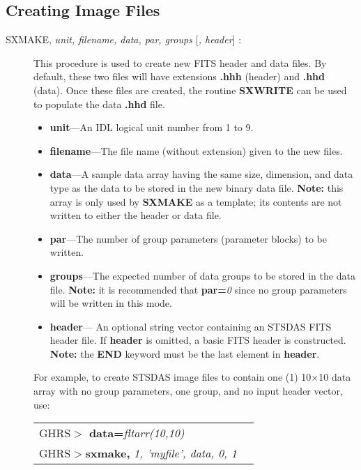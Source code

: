 \subsection{\bf Creating Image Files}
\begin{description}
\item [SXMAKE, {\it unit, filename, data, par, groups $[$, header$]$} :] 

This
procedure is used to create new FITS header and data files. By
default, these two files will have extensions {\bf .hhh} (header) and
{\bf .hhd} (data).  Once these files are created, the routine {\bf
SXWRITE} can be used to populate the data {\bf .hhd} file. 

\begin{itemize}

\item {\bf unit}---An IDL logical unit number from 1 to 9. 

\item {\bf filename}---The file name (without extension) given to the
new files. 

\item {\bf data}---A sample data array having the same size,
dimension, and data type as the data to be stored in the new binary
data file. {\bf Note:} this array is only used by {\bf SXMAKE} as a
template; its contents are not written to either the header or data
file. 

\item {\bf par}---The number of group parameters (parameter blocks) to
be written. 

\item {\bf groups}---The expected number of data groups to be stored
in the data file. {\bf Note:} it is recommended that {\bf par=}{\it 0}
since no group parameters will be written in this mode. 

\item {\bf header}--- An optional string vector containing an STSDAS
FITS header file.  If {\bf header} is omitted, a basic FITS
header is constructed.  {\bf Note:} the {\bf END} keyword must be the
last element in {\bf header}. 

\end{itemize}
\newpage
For example, 
to create STSDAS image files to contain one (1) 10$\times$10
data array with no group parameters, one group, and no input header
vector, use:\\ 

\begin{tabular}{ll}
GHRS$>$ {\bf data=}{\it fltarr(10,10)} & \\
GHRS$>${\bf sxmake,} {\it 1, 'myfile', data, 0, 1} & \\
\end{tabular}\\


\end{description}
